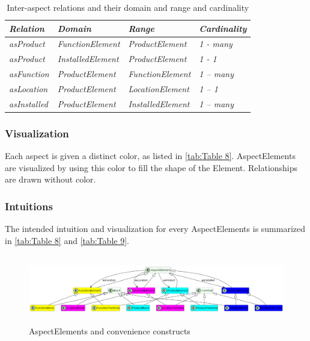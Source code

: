 \begin{table}[htb]\centering\caption{Inter-aspect relations and their domain and range and
    cardinality}\label{tab:Table 7}
  \begin{supertabular}{|m{1.5906599in}|m{1.7621598in}|m{2.0607598in}|m{0.7642598in}|}
    \hline
    {\bfseries\itshape Relation} &
    {\bfseries\itshape Domain} &
    {\bfseries\itshape Range} &
    {\bfseries\itshape Cardinality}\\\hline
    \textit{{asProduct}} &
    {\itshape FunctionElement} &
    {\itshape ProductElement} &
    {\itshape 1 - many}\\\hline
    {\itshape asProduct} &
    {\itshape InstalledElement} &
    {\itshape ProductElement} &
    {\itshape 1 - 1}\\\hline
    \textit{{asFunction}} &
    {\itshape ProductElement} &
    {\itshape FunctionElement} &
    {\itshape 1 -- many}\\\hline
    \textit{{asLocation}} &
    {\itshape ProductElement} &
    {\itshape LocationElement} &
    \textit{{1 -- 1}}\\\hline
    {\itshape asInstalled} &
    {\itshape ProductElement} &
    {\itshape InstalledElement} &
    {\itshape 1 -- many}\\\hline
  \end{supertabular}
\end{table}

\subsubsection{Visualization}
Each aspect is given a distinct color, as listed in \autoref{tab:Table 8}. AspectElements are visualized by using this color to fill
the shape of the Element. Relationships are drawn without color.

\subsubsection{Intuitions}
The intended intuition and visualization for every AspectElements is summarized in \autoref{tab:Table 8} and \autoref{tab:Table 9}.

\begin{figure}[htb]
  \centering
  \includegraphics[width=6.46875in,height=1.17246in]{img/IMFmanual-img042.png}
  \caption{AspectElements and convenience constructs}
  \label{fig:Figure 23}
\end{figure}

